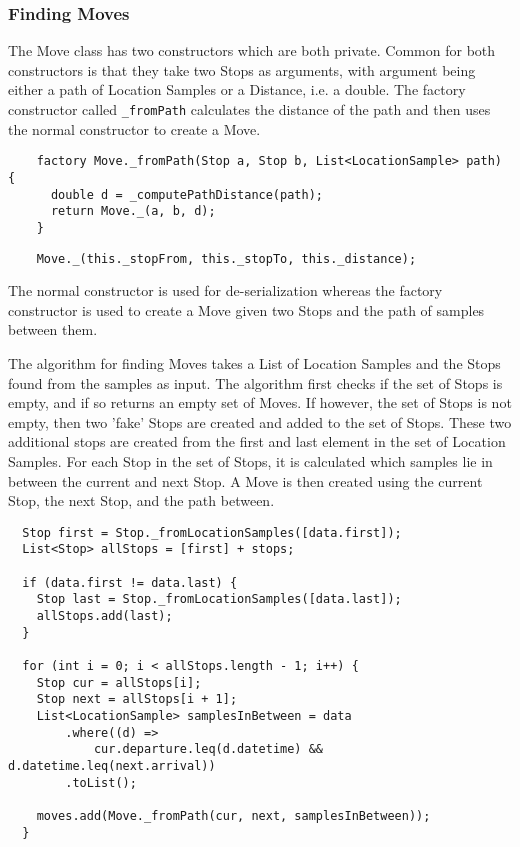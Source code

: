 \subsubsection{Finding Moves}
The Move class has two constructors which are both private. Common for both constructors is that they take two Stops as arguments, with argument being either a path of Location Samples or a Distance, i.e. a double. The factory constructor called \verb|_fromPath| calculates the distance of the path and then uses the normal constructor to create a Move. 
\begin{verbatim}
    factory Move._fromPath(Stop a, Stop b, List<LocationSample> path) {
      double d = _computePathDistance(path);
      return Move._(a, b, d);
    }
\end{verbatim}

\begin{verbatim}
    Move._(this._stopFrom, this._stopTo, this._distance);
\end{verbatim}
The normal constructor is used for de-serialization whereas the factory constructor is used to create a Move given two Stops and the path of samples between them.

The algorithm for finding Moves takes a List of Location Samples and the Stops found from the samples as input. The algorithm first checks if the set of Stops is empty, and if so returns an empty set of Moves. If however, the set of Stops is not empty, then two 'fake' Stops are created and added to the set of Stops. These two additional stops are created from the first and last element in the set of Location Samples. For each Stop in the set of Stops, it is calculated which samples lie in between the current and next Stop. A Move is then created using the current Stop, the next Stop, and the path between. 

\begin{verbatim}
  Stop first = Stop._fromLocationSamples([data.first]);
  List<Stop> allStops = [first] + stops;

  if (data.first != data.last) {
    Stop last = Stop._fromLocationSamples([data.last]);
    allStops.add(last);
  }

  for (int i = 0; i < allStops.length - 1; i++) {
    Stop cur = allStops[i];
    Stop next = allStops[i + 1];
    List<LocationSample> samplesInBetween = data
        .where((d) =>
            cur.departure.leq(d.datetime) && d.datetime.leq(next.arrival))
        .toList();

    moves.add(Move._fromPath(cur, next, samplesInBetween));
  }
\end{verbatim}


